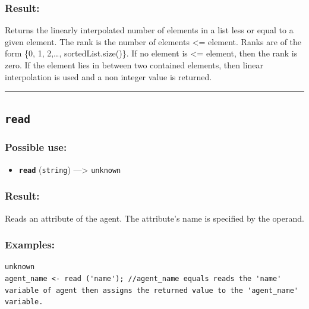 \documentclass[]{book}
\providecommand{\tightlist}{%
  \setlength{\itemsep}{0pt}\setlength{\parskip}{0pt}}
\theoremstyle{definition}
\theoremstyle{definition}
\theoremstyle{definition}
\theoremstyle{remark}
\begin{document}
\subsubsection{Result:}\label{result-414}

Returns the linearly interpolated number of elements in a list less or
equal to a given element. The rank is the number of elements
\textless{}= element. Ranks are of the form \{0, 1, 2,\ldots{},
sortedList.size()\}. If no element is \textless{}= element, then the
rank is zero. If the element lies in between two contained elements,
then linear interpolation is used and a non integer value is returned.

\begin{center}\rule{0.5\linewidth}{\linethickness}\end{center}

\subsection{\texorpdfstring{\texttt{read}}{read}}\label{read}

\subsubsection{Possible use:}\label{possible-use-429}

\begin{itemize}
\tightlist
\item
  \textbf{\texttt{read}} (\texttt{string}) ---\textgreater{}
  \texttt{unknown}
\end{itemize}

\subsubsection{Result:}\label{result-415}

Reads an attribute of the agent. The attribute's name is specified by
the operand.

\subsubsection{Examples:}\label{examples-294}

\begin{verbatim}
unknown 
agent_name <- read ('name'); //agent_name equals reads the 'name' variable of agent then assigns the returned value to the 'agent_name' variable. 
\end{verbatim}
\end{document}
